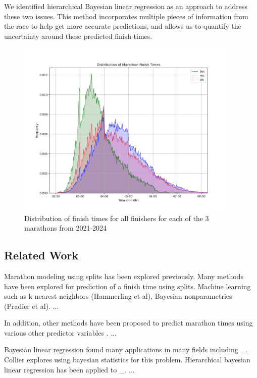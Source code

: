 \documentclass[USenglish,twocolumn]{article}
\theoremstyle{dgthm}
\theoremstyle{dgdef}
\begin{document}
We identified hierarchical Bayesian linear regression as an approach to address these two issues. This method incorporates multiple pieces of information from the race to help get more accurate predictions, and allows us to quantify the uncertainty around these predicted finish times.


\begin{figure}[ht]
    \centering
    \includegraphics[width=4.2in]{../analysis/plots/plot_dist.png}
    \caption{Distribution of finish times for all finishers for each of the 3 marathons from 2021-2024}
    \label{fig:plotdist}
\end{figure}

\subsection{Related Work} 
Marathon modeling using splits has been explored previously. Many methods have been explored for prediction of a finish time using splits. Machine learning such as k nearest neighbors  (Hammerling et al), Bayesian nonparametrics (Pradier et al). ...

In addition, other methods have been proposed to predict marathon times using various other predictor variables \cite{schmid:2012}. ...

Bayesian linear regression found many applications in many fields including \_. Collier \cite{collier:2017} explores using bayesian statistics for this problem. Hierarchical bayesian linear regression has been applied to \_.  ...
\end{document}
